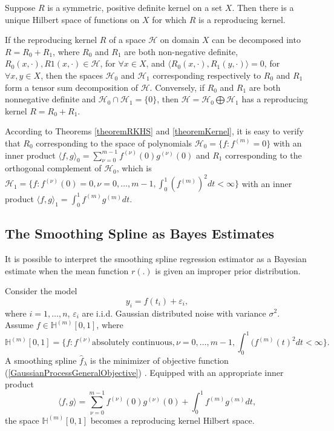 \begin{theorem}\cite{aronszajn1950theory}\label{theoremRKHS}
Suppose $R$ is a symmetric, positive definite kernel on a set $X$. Then there is a unique Hilbert space of functions on $X$ for which $R$ is a reproducing kernel. 
\end{theorem}

\begin{theorem}\cite{gu2013smoothing}\label{theoremKernel}
If the reproducing kernel $R$ of a space $\mathcal{H}$ on domain $X$ can
be decomposed into $R = R_0 + R_1$, where $R_0$ and $R_1$ are both non-negative definite, $R_0(x, \cdot),R1(x,\cdot) \in \mathcal{H}$, for $ \forall x \in X$, and $\langle R_0(x, \cdot),R_1(y, \cdot) \rangle= 0$, for $\forall x, y \in X$, then the spaces $\mathcal{H}_0$ and $\mathcal{H}_1$ corresponding respectively to $R_0$ and $R_1$ form a tensor sum decomposition of $\mathcal{H}$. Conversely, if $R_0$ and $R_1$ are both  nonnegative definite and $\mathcal{H}_0 \cap \mathcal{H}_1 =\{0\}$, then $\mathcal{H} =\mathcal{H}_0 \bigoplus \mathcal{H}_1$ has a reproducing kernel $R = R_0 + R_1$.
\end{theorem}

According to Theorems \ref{theoremRKHS} and \ref{theoremKernel}, it is easy to verify that $R_0$ corresponding to the space of polynomials $\mathcal{H}_0 =\{f:f^{(m)}=0\}$ with an inner product $\langle f, g \rangle_0 = \sum_{\nu=0}^{m-1} f^{(\nu)}(0)g^{(\nu)}(0)$ and $R_1$  corresponding to the orthogonal complement of $\mathcal{H}_0$, which is $\mathcal{H}_1 =\{  f:f^{(\nu)}(0)=0,\nu = 0, \ldots,m-1, \int_{0}^{1}(f^{(m)})^2dt <\infty  \}$ with an inner product $\langle f, g\rangle_1 = \int_{0}^{1}f^{(m)}g^{(m)}dt $. 


\subsection{The Smoothing Spline as Bayes Estimates}
It is possible to interpret the smoothing spline regression estimator as a Bayesian estimate when the mean function $r( .)$ is given an improper prior distribution. \cite{berlinet2011reproducing}
\cite{wahba1990spline}


Consider the model
\begin{equation}
y_i=f(t_i)+\varepsilon_i, 
\end{equation}
where $i=1, \ldots, n$, $\varepsilon_i$ are i.i.d. Gaussian distributed noise with variance $\sigma^2$. Assume $f\in \mathbb{H}^{(m)}[0,1]$, where
\begin{equation}
\mathbb{H}^{(m)}[0,1]=\{f:f^{(\nu)} \mbox{absolutely continuous}, \nu=0,\ldots,m-1, \int_{0}^{1} (f^{(m)}(t)^2dt<\infty \}.
\end{equation}
A smoothing spline $\hat{f}_\lambda$ is the minimizer of objective function (\ref{GaussianProcessGeneralObjective}) \cite{wang1998smoothing}. Equipped with an appropriate inner product
\begin{equation}
\langle f,g\rangle=\sum_{\nu=0}^{m-1}f^{(\nu)}(0)g^{(\nu)}(0)+\int_{0}^{1}f^{(m)}g^{(m)}dt,
\end{equation}
the space $\mathbb{H}^{(m)}[0,1]$ becomes a reproducing kernel Hilbert space.

